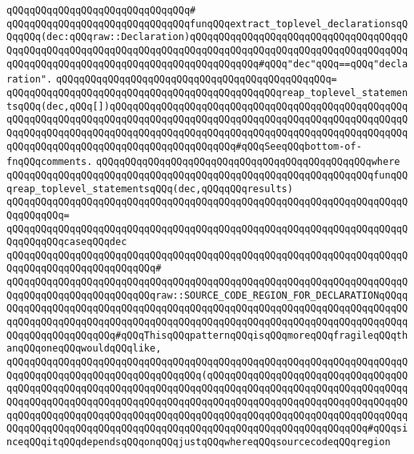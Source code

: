 \verb|qQQqqQQqqQQqqQQqqQQqqQQqqQQqqQQq#|\newline
\verb|qQQqqQQqqQQqqQQqqQQqqQQqqQQqqQQqfunqQQqextract_toplevel_declarationsqQQqqQQq(dec:qQQqraw::Declaration)qQQqqQQqqQQqqQQqqQQqqQQqqQQqqQQqqQQqqQQqqQQqqQQqqQQqqQQqqQQqqQQqqQQqqQQqqQQqqQQqqQQqqQQqqQQqqQQqqQQqqQQqqQQqqQQqqQQqqQQqqQQqqQQqqQQqqQQqqQQqqQQqqQQqqQQq#qQQq"dec"qQQq==qQQq"declaration".|\newline
\verb|qQQqqQQqqQQqqQQqqQQqqQQqqQQqqQQqqQQqqQQqqQQqqQQq=|\newline
\verb|qQQqqQQqqQQqqQQqqQQqqQQqqQQqqQQqqQQqqQQqqQQqqQQqreap_toplevel_statementsqQQq(dec,qQQq[])qQQqqQQqqQQqqQQqqQQqqQQqqQQqqQQqqQQqqQQqqQQqqQQqqQQqqQQqqQQqqQQqqQQqqQQqqQQqqQQqqQQqqQQqqQQqqQQqqQQqqQQqqQQqqQQqqQQqqQQqqQQqqQQqqQQqqQQqqQQqqQQqqQQqqQQqqQQqqQQqqQQqqQQqqQQqqQQqqQQqqQQqqQQqqQQqqQQqqQQqqQQqqQQqqQQqqQQqqQQqqQQqqQQqqQQq#qQQqSeeqQQqbottom-of-fnqQQqcomments.|\newline
\verb|qQQqqQQqqQQqqQQqqQQqqQQqqQQqqQQqqQQqqQQqqQQqqQQqwhere|\newline
\verb|qQQqqQQqqQQqqQQqqQQqqQQqqQQqqQQqqQQqqQQqqQQqqQQqqQQqqQQqqQQqqQQqfunqQQqreap_toplevel_statementsqQQq(dec,qQQqqQQqresults)|\newline
\verb|qQQqqQQqqQQqqQQqqQQqqQQqqQQqqQQqqQQqqQQqqQQqqQQqqQQqqQQqqQQqqQQqqQQqqQQqqQQqqQQq=|\newline
\verb|qQQqqQQqqQQqqQQqqQQqqQQqqQQqqQQqqQQqqQQqqQQqqQQqqQQqqQQqqQQqqQQqqQQqqQQqqQQqqQQqcaseqQQqdec|\newline
\verb|qQQqqQQqqQQqqQQqqQQqqQQqqQQqqQQqqQQqqQQqqQQqqQQqqQQqqQQqqQQqqQQqqQQqqQQqqQQqqQQqqQQqqQQqqQQqqQQq#|\newline
\verb|qQQqqQQqqQQqqQQqqQQqqQQqqQQqqQQqqQQqqQQqqQQqqQQqqQQqqQQqqQQqqQQqqQQqqQQqqQQqqQQqqQQqqQQqqQQqqQQqraw::SOURCE_CODE_REGION_FOR_DECLARATIONqQQqqQQqqQQqqQQqqQQqqQQqqQQqqQQqqQQqqQQqqQQqqQQqqQQqqQQqqQQqqQQqqQQqqQQqqQQqqQQqqQQqqQQqqQQqqQQqqQQqqQQqqQQqqQQqqQQqqQQqqQQqqQQqqQQqqQQqqQQqqQQqqQQqqQQqqQQqqQQqqQQq#qQQqThisqQQqpatternqQQqisqQQqmoreqQQqfragileqQQqthanqQQqoneqQQqwouldqQQqlike,|\newline
\verb|qQQqqQQqqQQqqQQqqQQqqQQqqQQqqQQqqQQqqQQqqQQqqQQqqQQqqQQqqQQqqQQqqQQqqQQqqQQqqQQqqQQqqQQqqQQqqQQqqQQqqQQq(qQQqqQQqqQQqqQQqqQQqqQQqqQQqqQQqqQQqqQQqqQQqqQQqqQQqqQQqqQQqqQQqqQQqqQQqqQQqqQQqqQQqqQQqqQQqqQQqqQQqqQQqqQQqqQQqqQQqqQQqqQQqqQQqqQQqqQQqqQQqqQQqqQQqqQQqqQQqqQQqqQQqqQQqqQQqqQQqqQQqqQQqqQQqqQQqqQQqqQQqqQQqqQQqqQQqqQQqqQQqqQQqqQQqqQQqqQQqqQQqqQQqqQQqqQQqqQQqqQQqqQQqqQQqqQQqqQQqqQQqqQQqqQQqqQQqqQQqqQQqqQQqqQQq#qQQqsinceqQQqitqQQqdependsqQQqonqQQqjustqQQqwhereqQQqsourcecodeqQQqregion|\newline
